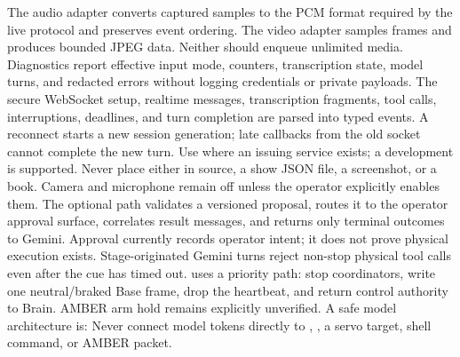 {}The audio adapter converts captured samples to the PCM format required by the live protocol and preserves event ordering. The video adapter samples frames and produces bounded JPEG data. Neither should enqueue unlimited media. Diagnostics report effective input mode, counters, transcription state, model turns, and redacted errors without logging credentials or private payloads.\markdownRendererParagraphSeparator
{}The secure WebSocket setup, realtime messages, transcription fragments, tool calls, interruptions, deadlines, and turn completion are parsed into typed events. A reconnect starts a new session generation; late callbacks from the old socket cannot complete the new turn.\markdownRendererParagraphSeparator
{}Use  where an issuing service exists; a development  is supported. Never place either in source, a show JSON file, a screenshot, or a book. Camera and microphone remain off unless the operator explicitly enables them.\markdownRendererInterblockSeparator
{}
\markdownRendererSectionEnd \markdownRendererSectionBegin
{}\markdownRendererInterblockSeparator
{}The optional  path validates a versioned proposal, routes it to the operator approval surface, correlates result messages, and returns only terminal outcomes to Gemini. Approval currently records operator intent; it does not prove physical execution exists.\markdownRendererParagraphSeparator
{}Stage-originated Gemini turns reject non-stop physical tool calls even after the cue has timed out.  uses a priority path: stop coordinators, write one neutral/braked Base frame, drop the heartbeat, and return control authority to Brain. AMBER arm hold remains explicitly unverified.\markdownRendererParagraphSeparator
{}A safe model architecture is:\markdownRendererInterblockSeparator
{}\markdownRendererInterblockSeparator
{}Never connect model tokens directly to , , a servo target, shell command, or AMBER packet.\markdownRendererInterblockSeparator
{}
\markdownRendererSectionEnd \markdownRendererSectionBegin
